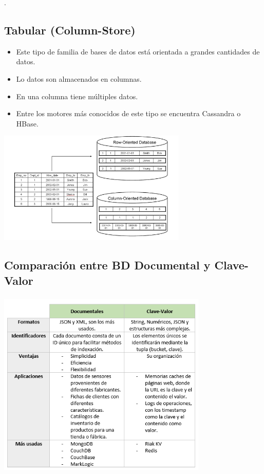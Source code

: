 \documentclass[%
 reprint,
 amsmath,amssymb,
 aps,
]{revtex4-1}
\begin{document}
.
\subsection{Tabular (Column-Store)}
\begin{itemize}
		\item Este tipo de familia de bases de datos está orientada a grandes cantidades de datos.
		\item Lo datos son almacenados en columnas.
		\item En una columna tiene múltiples datos.
                     \item Entre los motores más conocidos de este tipo se encuentra Cassandra o HBase.
	          \end{itemize} 
 \begin{center}
	\includegraphics[width=9cm]{./Imagenes/5}
\end{center}	
\subsection{Comparación entre BD Documental y Clave-Valor}
		\begin{center}
		\includegraphics[width=10cm,height=9cm]{./Imagenes/cuadro}
		\end{center}	
\end{document}
